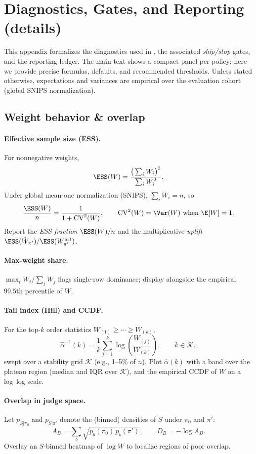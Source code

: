 \section{Diagnostics, Gates, and Reporting (details)}
\label{app:diagnostics}

This appendix formalizes the diagnostics used in \CJE{}, the associated \emph{ship/stop} gates, and the reporting ledger. The main text shows a compact panel per policy; here we provide precise formulas, defaults, and recommended thresholds. Unless stated otherwise, expectations and variances are empirical over the evaluation cohort (global SNIPS normalization).

\subsection{Weight behavior \& overlap}
\label{app:diag-weights}

\paragraph{Effective sample size (ESS).}
For nonnegative weights,
\[
\ESS(W)=\frac{\big(\sum_i W_i\big)^2}{\sum_i W_i^2}.
\]
Under global mean-one normalization (SNIPS), $\sum_i W_i=n$, so
\[
\frac{\ESS(W)}{n}=\frac{1}{1+\mathrm{CV}^2(W)},\qquad
\mathrm{CV}^2(W)=\Var(W)\ \text{when }\E[W]=1.
\]
Report the \emph{ESS fraction} $\ESS(W)/n$ and the multiplicative \emph{uplift}
$\ESS(\hat W_{\pi'})/\ESS(W^{\mathrm{m1}}_{\pi'})$.

\paragraph{Max-weight share.}
$\max_i W_i \big/ \sum_j W_j$ flags single-row dominance; display alongside the empirical 99.5th percentile of $W$.

\paragraph{Tail index (Hill) and CCDF.}
For the top-$k$ order statistics $W_{(1)}\ge\cdots\ge W_{(k)}$,
\[
\hat\alpha^{-1}(k)=\frac{1}{k}\sum_{j=1}^{k}\log\!\left(\frac{W_{(j)}}{W_{(k)}}\right),\qquad k\in\mathcal{K},
\]
swept over a stability grid $\mathcal{K}$ (e.g., 1--5\% of $n$). Plot $\hat\alpha(k)$ with a band over the plateau region (median and IQR over $\mathcal{K}$), and the empirical CCDF of $W$ on a log--log scale.

\paragraph{Overlap in judge space.}
Let $p_{S|\pi_0}$ and $p_{S|\pi'}$ denote the (binned) densities of $S$ under $\pi_0$ and $\pi'$:
\[
A_B=\sum_{b}\sqrt{p_b(\pi_0)\,p_b(\pi')},\qquad D_B=-\log A_B.
\]
Overlay an $S$-binned heatmap of $\log W$ to localize regions of poor overlap.

